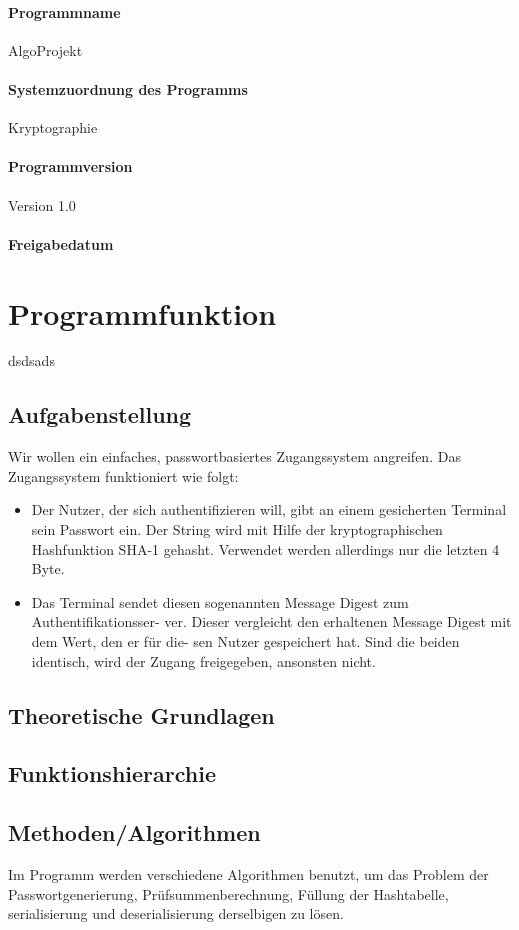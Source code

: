\documentclass[11pt]{article}
\begin{document}
  \paragraph{Programmname}
  AlgoProjekt
  \paragraph{Systemzuordnung des Programms}
  Kryptographie
  \paragraph{Programmversion}
  Version 1.0
  \paragraph{Freigabedatum}
  \date{26.11.2013}
  \section{Programmfunktion}
  dsdsads
  \subsection{Aufgabenstellung}
  Wir wollen ein einfaches, passwortbasiertes Zugangssystem angreifen. Das Zugangssystem
funktioniert wie folgt:
\begin{itemize} 
\item Der Nutzer, der sich authentifizieren will, gibt an einem gesicherten Terminal sein
Passwort ein. Der String wird mit Hilfe der kryptographischen Hashfunktion SHA-1
gehasht. Verwendet werden allerdings nur die letzten 4 Byte.
\item Das Terminal sendet diesen sogenannten Message Digest zum Authentifikationsser-
ver. Dieser vergleicht den erhaltenen Message Digest mit dem Wert, den er für die-
sen Nutzer gespeichert hat. Sind die beiden identisch, wird der Zugang freigegeben,
ansonsten nicht.
\end{itemize}
  \subsection{Theoretische Grundlagen}
  \subsection{Funktionshierarchie}
  \subsection{Methoden/Algorithmen}
  Im Programm werden verschiedene Algorithmen benutzt, um das Problem der Passwortgenerierung, Prüfsummenberechnung, Füllung der Hashtabelle, serialisierung und deserialisierung derselbigen zu lösen.
\end{document}
